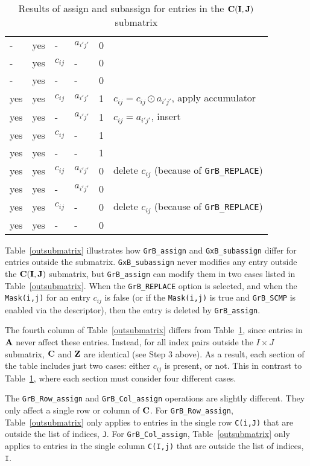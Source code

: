 \documentclass[12pt]{article}
\begin{document}
\begin{table}
{\begin{tabular}{lllll|l}
    -  &yes &  -       & $a_{i'j'}$  & 0    &   \\
    -  &yes & $c_{ij}$ &  -          & 0    &   \\
    -  &yes &  -       &  -          & 0    &   \\
\hline
    yes&yes & $c_{ij}$ & $a_{i'j'}$  & 1    &  $c_{ij} = c_{ij} \odot a_{i'j'}$, apply accumulator \\
    yes&yes &  -       & $a_{i'j'}$  & 1    &  $c_{ij} = a_{i'j'}$, insert \\
    yes&yes & $c_{ij}$ &  -          & 1    &   \\
    yes&yes &  -       &  -          & 1    &   \\
\hline
    yes&yes & $c_{ij}$ & $a_{i'j'}$  & 0    &  delete $c_{ij}$  (because of \verb'GrB_REPLACE') \\
    yes&yes &  -       & $a_{i'j'}$  & 0    &   \\
    yes&yes & $c_{ij}$ &  -          & 0    &  delete $c_{ij}$  (because of \verb'GrB_REPLACE') \\
    yes&yes &  -       &  -          & 0    &   \\
\hline
\end{tabular}
}
\caption{Results of assign and subassign for entries in the ${\bf C(I,J)}$ submatrix \label{insubmatrix}}
\end{table}

\newpage
Table~\ref{outsubmatrix} illustrates how \verb'GrB_assign' and
\verb'GxB_subassign' differ for entries outside the submatrix.
\verb'GxB_subassign' never modifies any entry outside the ${\bf C(I,J)}$
submatrix, but \verb'GrB_assign' can modify them in two cases listed in
Table~\ref{outsubmatrix}.  When the \verb'GrB_REPLACE' option is selected, and
when the \verb'Mask(i,j)' for an entry $c_{ij}$ is false (or if the
\verb'Mask(i,j)' is true and \verb'GrB_SCMP' is enabled via the descriptor),
then the entry is deleted by \verb'GrB_assign'.

The fourth column of Table~\ref{outsubmatrix} differs from
Table~\ref{insubmatrix}, since entries in ${\bf A}$ never affect these entries.
Instead, for all index pairs outside the $I \times J$ submatrix, ${\bf C}$ and
${\bf Z}$ are identical (see Step 3 above).  As a result, each section of the
table includes just two cases: either $c_{ij}$ is present, or not.   This in
contrast to Table~\ref{insubmatrix}, where each section must consider four
different cases.

The \verb'GrB_Row_assign' and \verb'GrB_Col_assign' operations are slightly
different.  They only affect a single row or column of ${\bf C}$.
For \verb'GrB_Row_assign', Table~\ref{outsubmatrix} only applies to entries in
the single row \verb'C(i,J)' that are outside the list of indices, \verb'J'.
For \verb'GrB_Col_assign', Table~\ref{outsubmatrix} only applies to entries in
the single column \verb'C(I,j)' that are outside the list of indices, \verb'I'.
\end{document}
